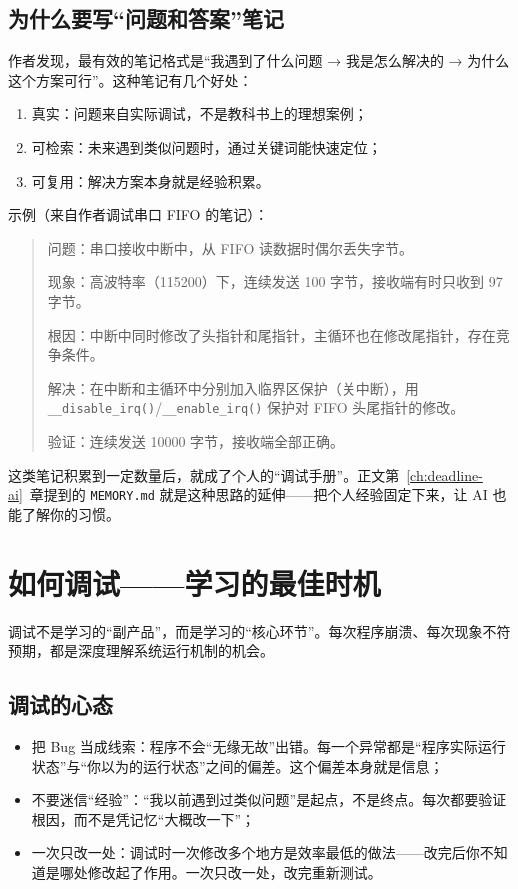 \subsection{为什么要写“问题和答案”笔记}

作者发现，最有效的笔记格式是“我遇到了什么问题 → 我是怎么解决的 → 为什么这个方案可行”。这种笔记有几个好处：

\begin{enumerate}
	\item 真实：问题来自实际调试，不是教科书上的理想案例；
	\item 可检索：未来遇到类似问题时，通过关键词能快速定位；
	\item 可复用：解决方案本身就是经验积累。
\end{enumerate}

示例（来自作者调试串口 FIFO 的笔记）：

\begin{quote}
	问题：串口接收中断中，从 FIFO 读数据时偶尔丢失字节。
	
	现象：高波特率（115200）下，连续发送 100 字节，接收端有时只收到 97 字节。
	
	根因：中断中同时修改了头指针和尾指针，主循环也在修改尾指针，存在竞争条件。
	
	解决：在中断和主循环中分别加入临界区保护（关中断），用 \texttt{\_\_disable\_irq()}/\texttt{\_\_enable\_irq()} 保护对 FIFO 头尾指针的修改。
	
	验证：连续发送 10000 字节，接收端全部正确。
\end{quote}

这类笔记积累到一定数量后，就成了个人的“调试手册”。正文第~\ref{ch:deadline-ai}~章提到的 \texttt{MEMORY.md} 就是这种思路的延伸——把个人经验固定下来，让 AI 也能了解你的习惯。

\section{如何调试——学习的最佳时机}

调试不是学习的“副产品”，而是学习的“核心环节”。每次程序崩溃、每次现象不符预期，都是深度理解系统运行机制的机会。

\subsection{调试的心态}

\begin{itemize}
	\item 把 Bug 当成线索：程序不会“无缘无故”出错。每一个异常都是“程序实际运行状态”与“你以为的运行状态”之间的偏差。这个偏差本身就是信息；
	\item 不要迷信“经验”：“我以前遇到过类似问题”是起点，不是终点。每次都要验证根因，而不是凭记忆“大概改一下”；
	\item 一次只改一处：调试时一次修改多个地方是效率最低的做法——改完后你不知道是哪处修改起了作用。一次只改一处，改完重新测试。
\end{itemize}

